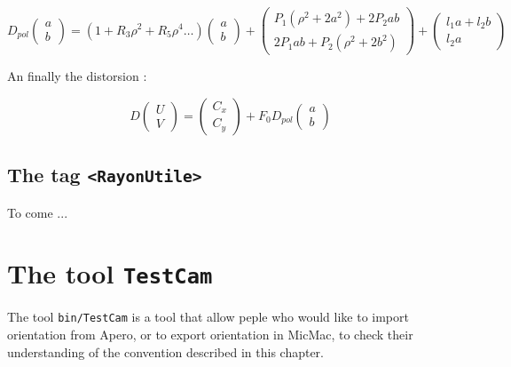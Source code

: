\begin{equation}
   D_{pol}\begin{pmatrix}a\\b\end{pmatrix}
   = (1+R_3 \rho^2 + R_5 \rho^4  \dots ) \begin{pmatrix}a\\b\end{pmatrix}
    + \begin{pmatrix}P_1( \rho^2+2a^2) + 2P_2ab \\ 2P_1ab + P_2(\rho^2+2b^2)\end{pmatrix}
    +\begin{pmatrix}  l_1 a + l_2 b \\  l_2 a  \end{pmatrix}
\end{equation}

An finally the distorsion :


\begin{equation}
   D\begin{pmatrix}U\\V\end{pmatrix}
   = \begin{pmatrix}C_x\\C_y\end{pmatrix} + F_0 D_{pol}\begin{pmatrix}a\\b\end{pmatrix}
\end{equation}




\subsection{The tag {\tt <RayonUtile>}}

\label{SpGep:RU}

To come ...



\section{The tool {\tt TestCam}}

The tool {\tt bin/TestCam} is a tool that allow peple who would like
to import orientation from Apero, or to export orientation in MicMac,
to check their understanding of the convention described in this chapter.

